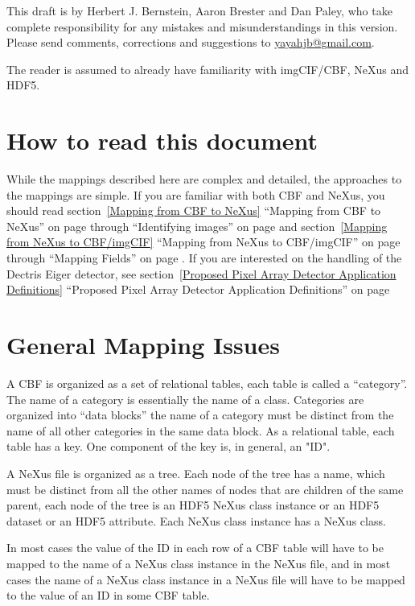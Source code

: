 \documentclass[11pt]{article}
\begin{document}
This draft is by Herbert J. Bernstein, Aaron Brester and Dan Paley, who take complete responsibility for any
mistakes and misunderstandings in this version.  Please send comments,
corrections and suggestions to \url{yayahjb@gmail.com}.

The reader is assumed to already have familiarity with imgCIF/CBF, NeXus and HDF5.

\section{How to read this document}

While the mappings described here are complex and detailed, the approaches to the
mappings are simple.  If you are familiar with both CBF and NeXus, you should
read section~\ref{Mapping from CBF to NeXus} ``Mapping from CBF to NeXus'' 
on page \pageref{Mapping from CBF to NeXus}
through ``Identifying images'' on page \pageref{Identifying images} and
section~\ref{Mapping from NeXus to CBF/imgCIF} ``Mapping from NeXus to CBF/imgCIF'' 
on page \pageref{Mapping from NeXus to CBF/imgCIF}
through ``Mapping Fields'' on page \pageref{Mapping Fields}.  If you are interested
on the handling of the Dectris Eiger detector, see 
section~\ref{Proposed Pixel Array Detector Application Definitions} 
``Proposed Pixel Array Detector Application Definitions''
on page \pageref{Proposed Pixel Array Detector Application Definitions}




\section{General Mapping Issues}
\label{General Mapping Issues}

A CBF is organized as a set of relational tables, each table is called a ``category''.
The name of a category is essentially the name of a class.  Categories are organized
into ``data blocks'' the name of a category must be distinct from the name of all
other categories in the same data block.  As a relational table, each table has a
key.  One component of the key is, in general, an "ID".

A NeXus file is organized as a tree.   Each node of the tree has a name, which
must be distinct from all the other names of nodes that are children of the
same parent, each node of the tree is an HDF5 NeXus class instance or an HDF5 dataset or
an HDF5 attribute.  Each NeXus class instance has a NeXus class.

In most cases the value of the ID in each row of a CBF table will have to be mapped
to the name of a NeXus class instance in the NeXus file, and in most cases the name of a NeXus class instance in
a NeXus file will have to be mapped to the value of an ID in some CBF table.
\end{document}
